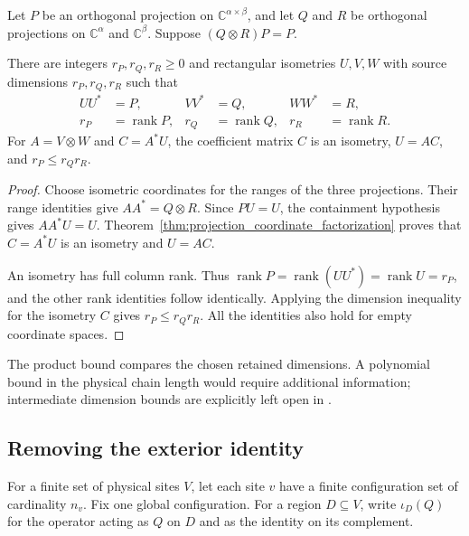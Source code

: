 \begin{theorem}
    \label{thm:projection_tensor_coordinates}
    \leanok
    Let $P$ be an orthogonal projection on $\mathbb C^{\alpha\times\beta}$,
    and let $Q$ and $R$ be orthogonal projections on $\mathbb C^\alpha$
    and $\mathbb C^\beta$. Suppose $(Q\otimes R)P=P$.

    There are integers $r_P,r_Q,r_R\ge0$ and
    rectangular isometries $U,V,W$ with source dimensions $r_P,r_Q,r_R$
    such that
    \begin{align}
        UU^*&=P,& VV^*&=Q,& WW^*&=R,
        \label{eq:projection_tensor_ranges}\\
        r_P&=\operatorname{rank}P,&
        r_Q&=\operatorname{rank}Q,&
        r_R&=\operatorname{rank}R.
        \label{eq:projection_tensor_dimensions}
    \end{align}
    For $A=V\otimes W$ and $C=A^*U$, the coefficient matrix $C$ is an
    isometry, $U=AC$, and $r_P\le r_Qr_R$.
\end{theorem}
\begin{proof}\leanok
    Choose isometric coordinates for the ranges of the three projections.
    Their range identities give $AA^*=Q\otimes R$. Since $PU=U$, the
    containment hypothesis gives $AA^*U=U$.
    Theorem~\ref{thm:projection_coordinate_factorization} proves that
    $C=A^*U$ is an isometry and $U=AC$.

    An isometry has full column rank. Thus
    $\operatorname{rank}P=\operatorname{rank}(UU^*)=
    \operatorname{rank}U=r_P$, and the other rank identities follow
    identically. Applying the dimension inequality for the isometry $C$
    gives $r_P\le r_Qr_R$. All the identities also hold for empty
    coordinate spaces.
\end{proof}

The product bound compares the chosen retained dimensions. A polynomial
bound in the physical chain length would require additional information;
intermediate dimension bounds are explicitly left open in
\cite[lines 104--109]{Hastings2006Solving}.


\subsection{Removing the exterior identity}

For a finite set of physical sites $V$, let each site $v$ have a finite
configuration set of cardinality $n_v$. Fix one global configuration.
For a region $D\subseteq V$, write $\iota_D(Q)$ for the operator acting as
$Q$ on $D$ and as the identity on its complement.

